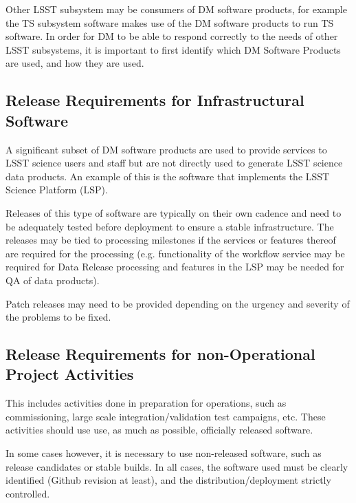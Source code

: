 Other \gls{LSST} subsystem may be consumers of \gls{DM} software products, for example the \gls{TS} subsystem software makes use of the \gls{DM} software products to run  \gls{TS} software. 
In order for \gls{DM} to be able to respond correctly to the needs of other \gls{LSST} subsystems, it is important to first identify which \gls{DM} Software Products are used, and how they are used.

\subsection{Release Requirements for Infrastructural Software} \label{sec:infreqs}

A significant subset of DM software products are used to provide services to LSST science users and staff but are not directly used to generate LSST science data products. An example of this is the software that implements the LSST Science Platform (LSP).

Releases of this type of software are typically on their own cadence and need to be adequately tested before deployment to ensure a stable infrastructure. The releases may be tied to processing milestones if the services or features thereof are required for the processing (e.g. functionality of the workflow service may be required for Data Release processing and features in the LSP may be needed for QA of data products).

Patch releases may need to be provided depending on the urgency and severity of the problems to be fixed.


\subsection{Release Requirements for non-Operational Project Activities} \label{sec:nonopsreqs}

This includes activities done in preparation for operations, such as commissioning, 
large scale integration/validation test campaigns, etc. These activities should use use,  as much as possible,  officially released software.

In some cases however, it is necessary to use non-released software, such as release candidates or stable builds.
In all cases, the software used must be clearly identified (Github revision at least), and the distribution/deployment strictly controlled.

